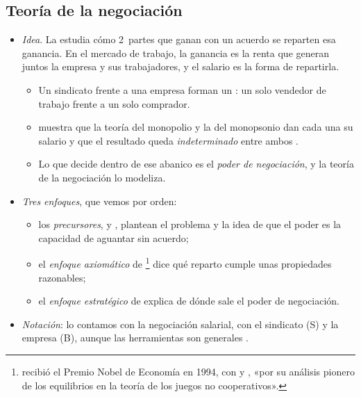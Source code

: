 \documentclass[11pt]{article}
\begin{document}
\subsection{Teoría de la negociación}\label{sec:teoria-negociacion}

\begin{itemize}
\item \emph{Idea}. La  estudia cómo 2~partes que ganan con un acuerdo se reparten esa ganancia. En el mercado de trabajo, la ganancia es la renta que generan juntos la empresa y sus trabajadores, y el salario es la forma de repartirla.
  \begin{itemize}
  \item Un sindicato frente a una empresa forman un : un solo vendedor de trabajo frente a un solo comprador.
  \item \textcite{Bowley1928Bilateral} muestra que la teoría del monopolio y la del monopsonio dan cada una su salario y que el resultado queda \emph{indeterminado} entre ambos .
  \item Lo que decide dentro de ese abanico es el \emph{poder de negociación}, y la teoría de la negociación lo modeliza.
  \end{itemize}
\item \emph{Tres enfoques}, que vemos por orden:
  \begin{itemize}
  \item los \emph{precursores},  y , plantean el problema y la idea de que el poder es la capacidad de aguantar sin acuerdo;
  \item el \emph{enfoque axiomático} de \footnote{ recibió el Premio Nobel de Economía en 1994, con  y , «por su análisis pionero de los equilibrios en la teoría de los juegos no cooperativos»\nocite{Nobel1994Nash}.} dice qué reparto cumple unas propiedades razonables;
  \item el \emph{enfoque estratégico} de  explica de dónde sale el poder de negociación.
  \end{itemize}
\item \emph{Notación}: lo contamos con la negociación salarial, con el sindicato (S) y la empresa (B), aunque las herramientas son generales .
\end{itemize}
\end{document}
